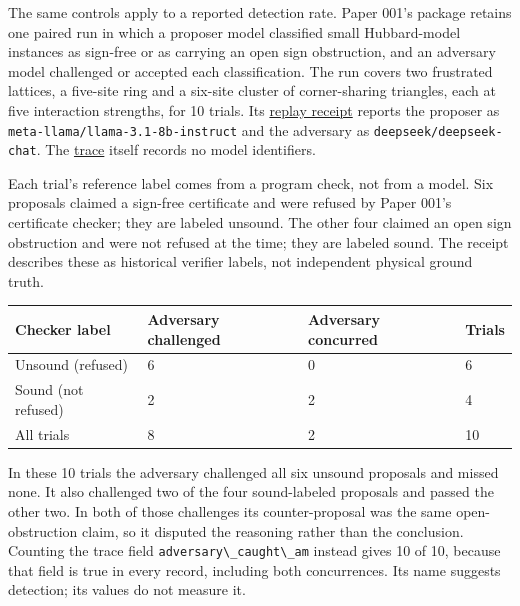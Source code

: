 \documentclass[
  11pt,
]{article}
\newcommand{\passthrough}[1]{#1}
\begin{document}
The same controls apply to a reported detection rate. Paper 001's
package retains one paired run in which a proposer model classified
small Hubbard-model instances as sign-free or as carrying an open sign
obstruction, and an adversary model challenged or accepted each
classification. The run covers two frustrated lattices, a five-site ring
and a six-site cluster of corner-sharing triangles, each at five
interaction strengths, for 10 trials. Its
\href{https://github.com/dbccpage/the_symbol_game/blob/52cb5457f6c485ba548cfd292f6012a941ed22cf/atlas/coda_atlas/symbol_game/001_pfp_discrete_cochain_retraction_and_toy_involutions/results/demo2_r7_adversarial_debate_receipt.json}{replay
receipt} reports the proposer as
\nolinkurl{meta-llama/llama-3.1-8b-instruct} and the adversary as
\passthrough{\lstinline!deepseek/deepseek-chat!}. The
\href{https://github.com/dbccpage/the_symbol_game/blob/52cb5457f6c485ba548cfd292f6012a941ed22cf/atlas/coda_atlas/symbol_game/001_pfp_discrete_cochain_retraction_and_toy_involutions/results/demo2_r7_adversarial_debate_1790210039.jsonl}{trace}
itself records no model identifiers.

Each trial's reference label comes from a program check, not from a
model. Six proposals claimed a sign-free certificate and were refused by
Paper 001's certificate checker; they are labeled unsound. The other
four claimed an open sign obstruction and were not refused at the time;
they are labeled sound. The receipt describes these as historical
verifier labels, not independent physical ground truth.

\begin{longtable}[]{@{}llll@{}}
\toprule\noalign{}
Checker label & Adversary challenged & Adversary concurred & Trials \\
\midrule\noalign{}
\endhead
\bottomrule\noalign{}
\endlastfoot
Unsound (refused) & 6 & 0 & 6 \\
Sound (not refused) & 2 & 2 & 4 \\
All trials & 8 & 2 & 10 \\
\end{longtable}

In these 10 trials the adversary challenged all six unsound proposals
and missed none. It also challenged two of the four sound-labeled
proposals and passed the other two. In both of those challenges its
counter-proposal was the same open-obstruction claim, so it disputed the
reasoning rather than the conclusion. Counting the trace field
\passthrough{\lstinline!adversary\_caught\_am!} instead gives 10 of 10,
because that field is true in every record, including both concurrences.
Its name suggests detection; its values do not measure it.
\end{document}
